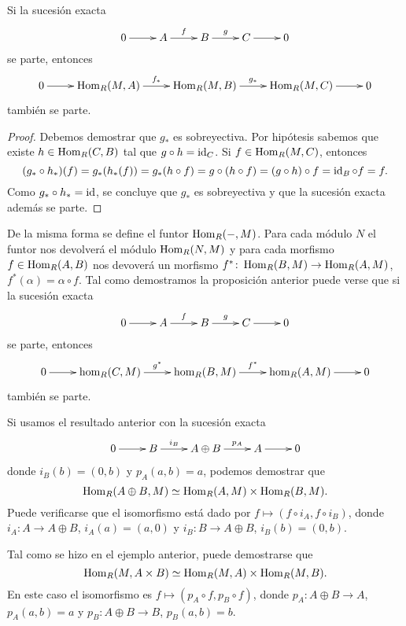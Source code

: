 \begin{proposition}
	Si la sucesión exacta
		\[
	\xymatrix{
	 0\ar[r] 
	 & A
	 \ar[r]^-{f}
	 & B
	 \ar[r]^-{g}
	 & C\ar[r]
	 & 0
	 }
	\]
	se parte, entonces 
	 \[
	\xymatrix{
	 0\ar[r] 
	 & \Hom_R(M,A)
	 \ar[r]^-{f_*}
	 & \Hom_R(M,B)
	 \ar[r]^-{g_*}
	 & \Hom_R(M,C)\ar[r]
	 & 0
	 }
	\]
	también se parte.
\end{proposition}

\begin{proof}
Debemos demostrar que $g_*$ es sobreyectiva. Por hipótesis sabemos que existe $h\in\operatorname{Hom}_R(C,B)$ tal que
$g\circ h=\operatorname{id}_C$. 
Si $f\in\operatorname{Hom}_R(M,C)$, entonces
\[
(g_*\circ h_*)(f)=g_*(h_*(f))=g_*(h\circ f)=g\circ (h\circ f)=(g\circ h)\circ f=\operatorname{id}_B\circ f=f.
\]
Como $g_*\circ h_*=\operatorname{id}$, se concluye que $g_*$ es sobreyectiva y que la sucesión exacta además se parte. 
\end{proof}

De la misma forma se define el funtor $\operatorname{Hom}_R(-,M)$. 
Para cada 
módulo $N$ el funtor nos devolverá el módulo $\operatorname{Hom}_R(N,M)$ y para cada
morfismo $f\in\operatorname{Hom}_R(A,B)$ nos devoverá un morfismo $f^*\colon\operatorname{Hom}_R(B,M)\to\operatorname{Hom}_R(A,M)$, 
$f^*(\alpha)=\alpha\circ f$. Tal como demostramos la proposición anterior
puede verse que
si la sucesión exacta
		\[
	\xymatrix{
	 0\ar[r] 
	 & A
	 \ar[r]^-{f}
	 & B
	 \ar[r]^-{g}
	 & C\ar[r]
	 & 0
	 }
	\]
	se parte, entonces 
	 \[
	\xymatrix{
	 0\ar[r] 
	 & \hom_R(C,M)
	 \ar[r]^-{g^*}
	 & \hom_R(B,M)
	 \ar[r]^-{f^*}
	 & \hom_R(A,M)\ar[r]
	 & 0
	 }
	\]
también se parte. 

\begin{example}
Si usamos el resultado anterior
con la sucesión exacta
\[
	\xymatrix{
	 0\ar[r] 
	 & B
	 \ar[r]^-{i_B}
	 & A\oplus B
	 \ar[r]^-{p_A}
	 & A\ar[r]
	 & 0
	 }
	\]
donde $i_B(b)=(0,b)$ y $p_A(a,b)=a$,  
podemos demostrar que  
\begin{equation}
\label{eq:hom1}
\operatorname{Hom}_R(A\oplus B,M)\simeq \operatorname{Hom}_R(A,M)\times\operatorname{Hom}_R(B,M).
\end{equation}
Puede verificarse que el isomorfismo está dado por $f\mapsto (f\circ i_A,f\circ i_B)$, 
donde $i_A\colon A\to A\oplus B$, $i_A(a)=(a,0)$ y 
$i_B\colon B\to A\oplus B$, $i_B(b)=(0,b)$.
\end{example}

\begin{example}
Tal como se hizo en el ejemplo anterior, puede demostrarse que 
\begin{equation}
\label{eq:hom2}	
\operatorname{Hom}_R(M,A\times B)\simeq \operatorname{Hom}_R(M,A)\times\operatorname{Hom}_R(M,B).	
\end{equation}
En este caso el isomorfismo es $f\mapsto (p_A\circ f,p_B\circ f)$, 
donde $p_A\colon A\oplus B\to A$, $p_A(a,b)=a$ y  
$p_B\colon A\oplus B\to B$, $p_B(a,b)=b$. 
\end{example}

